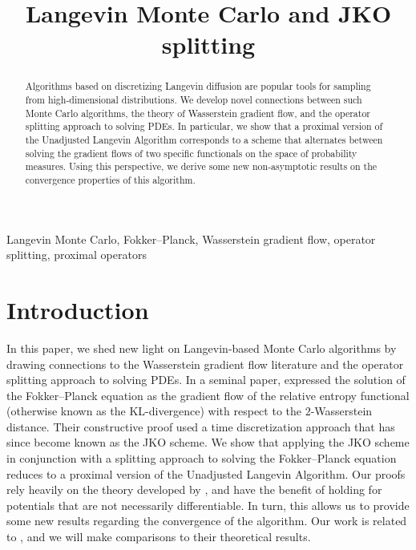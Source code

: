 \documentclass[final,12pt]{colt2018}
\title[LMC and JKO splitting]{Langevin Monte Carlo and JKO splitting}
\begin{document}
\maketitle

\begin{abstract}
Algorithms based on discretizing Langevin diffusion are popular tools for sampling from high-dimensional distributions. We develop novel connections between such Monte Carlo algorithms, the theory of Wasserstein gradient flow, and the operator splitting approach to solving PDEs. In particular, we show that a proximal version of the Unadjusted Langevin Algorithm corresponds to a scheme that alternates between solving the gradient flows of two specific functionals on the space of probability measures. Using this perspective, we derive some new non-asymptotic results on the convergence properties of this algorithm.
\end{abstract}

\begin{keywords}
Langevin Monte Carlo, Fokker--Planck, Wasserstein gradient flow, operator splitting, proximal operators
\end{keywords}

\section{Introduction}

In this paper, we shed new light on Langevin-based Monte Carlo algorithms by drawing connections to the Wasserstein gradient flow literature and the operator splitting approach to solving PDEs. In a seminal paper, \citet{jordan1998variational} expressed the solution of the Fokker--Planck equation as the gradient flow of the relative entropy functional (otherwise known as the KL-divergence) with respect to the $2$-Wasserstein distance. Their constructive proof used a time discretization approach that has since become known as the JKO scheme. We show that applying the JKO scheme in conjunction with a splitting approach to solving the Fokker--Planck equation reduces to a proximal version of the Unadjusted Langevin Algorithm. Our proofs rely heavily on the theory developed by \citet{ambrosio2005}, and have the benefit of holding for potentials that are not necessarily differentiable. In turn, this allows us to provide some new results regarding the convergence of the algorithm. Our work is related to \citet{durmus2016efficient}, and we will make comparisons to their theoretical results.
\end{document}
